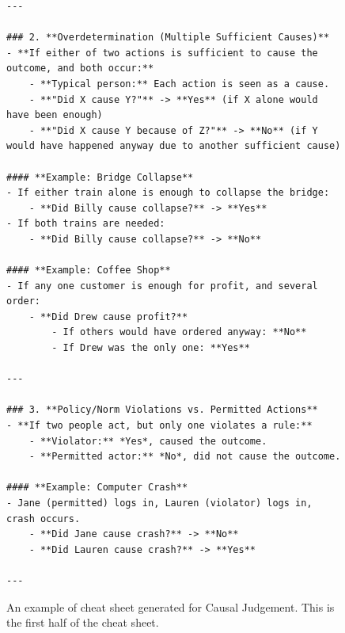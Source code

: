 \begin{figure}[t]
\begin{tcolorbox}[title=Cheat Sheet for Causal Judgement (1/2), colback=gray!10, colframe=black!70, boxrule=0.5pt, top=0pt, bottom=0pt, left=0pt, right=0pt, arc=0.8mm, width=1.0\textwidth]
\begin{lstlisting}
---

### 2. **Overdetermination (Multiple Sufficient Causes)**
- **If either of two actions is sufficient to cause the outcome, and both occur:**
    - **Typical person:** Each action is seen as a cause.
    - **"Did X cause Y?"** -> **Yes** (if X alone would have been enough)
    - **"Did X cause Y because of Z?"** -> **No** (if Y would have happened anyway due to another sufficient cause)

#### **Example: Bridge Collapse**
- If either train alone is enough to collapse the bridge:
    - **Did Billy cause collapse?** -> **Yes**
- If both trains are needed:
    - **Did Billy cause collapse?** -> **No**

#### **Example: Coffee Shop**
- If any one customer is enough for profit, and several order:
    - **Did Drew cause profit?**
        - If others would have ordered anyway: **No**
        - If Drew was the only one: **Yes**

---

### 3. **Policy/Norm Violations vs. Permitted Actions**
- **If two people act, but only one violates a rule:**
    - **Violator:** *Yes*, caused the outcome.
    - **Permitted actor:** *No*, did not cause the outcome.

#### **Example: Computer Crash**
- Jane (permitted) logs in, Lauren (violator) logs in, crash occurs.
    - **Did Jane cause crash?** -> **No**
    - **Did Lauren cause crash?** -> **Yes**

---
\end{lstlisting}
\end{tcolorbox}
\caption{
An example of cheat sheet generated for Causal Judgement.
This is the first half of the cheat sheet.
}
\label{fig:cheat_sheet_causal_1}
\end{figure}